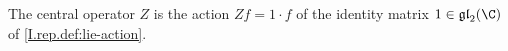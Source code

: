The central operator $Z$ is the action $Z f=1\cdot f$ of the identity matrix $1\in\mathfrak{gl}_2(\C)$ of \cref{I.rep.def:lie-action}.
